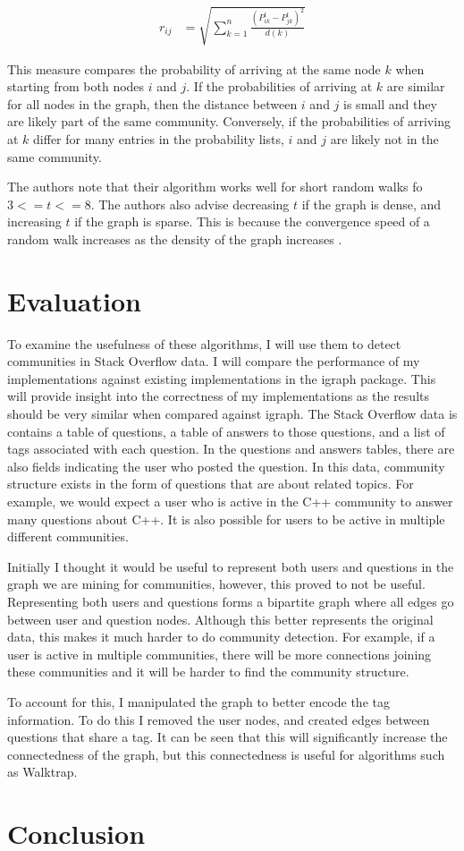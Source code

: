 \documentclass{article}
\begin{document}
    \begin{align}
        r_{ij} &= \sqrt{\sum^n_{k=1}{\frac{(P^t_{ik} - P^t_{jk})^2}{d(k)}}}
    \end{align}

    This measure compares the probability of arriving at the same node $k$ when starting from both nodes $i$ and $j$. If the probabilities of arriving at $k$ are similar for all nodes in the graph, then the distance between $i$ and $j$ is small and they are likely part of the same community. Conversely, if the probabilities of arriving at $k$ differ for many entries in the probability lists, $i$ and $j$ are likely not in the same community.
    \par
    The authors note that their algorithm works well for short random walks fo $3 <= t <= 8$. The authors also advise decreasing $t$ if the graph is dense, and increasing $t$ if the graph is sparse. This is because the convergence speed of a random walk increases as the density of the graph increases \cite{10.1007/11569596_31}.

\section{Evaluation}
To examine the usefulness of these algorithms, I will use them to detect communities in Stack Overflow data. I will compare the performance of my implementations against existing implementations in the igraph package. This will provide insight into the correctness of my implementations as the results should be very similar when compared against igraph. The Stack Overflow data is contains a table of questions, a table of answers to those questions, and a list of tags associated with each question. In the questions and answers tables, there are also fields indicating the user who posted the question. In this data, community structure exists in the form of questions that are about related topics. For example, we would expect a user who is active in the C++ community to answer many questions about C++. It is also possible for users to be active in multiple different communities.
\par
Initially I thought it would be useful to represent both users and questions in the graph we are mining for communities, however, this proved to not be useful. Representing both users and questions forms a bipartite graph where all edges go between user and question nodes. Although this better represents the original data, this makes it much harder to do community detection. For example, if a user is active in multiple communities, there will be more connections joining these communities and it will be harder to find the community structure.
\par
To account for this, I manipulated the graph to better encode the tag information. To do this I removed the user nodes, and created edges between questions that share a tag. It can be seen that this will significantly increase the connectedness of the graph, but this connectedness is useful for algorithms such as Walktrap.


\section{Conclusion}

\newpage


\end{document}
